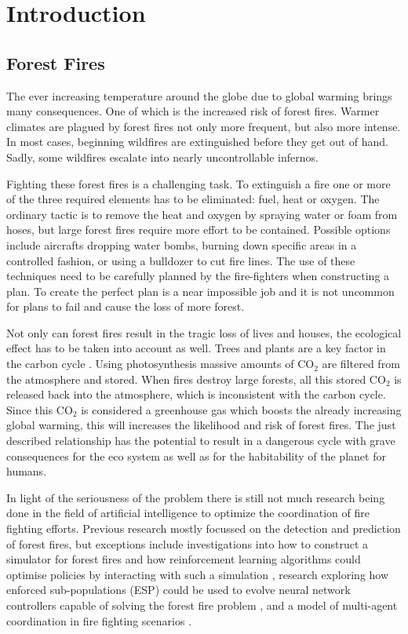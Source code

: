 
\section{Introduction}\label{sec:introduction}

\subsection{Forest Fires}
The ever increasing temperature around the globe due to global warming brings many consequences. One of which is the increased risk of forest fires. Warmer climates are plagued by forest fires not only more frequent, but also more intense.  In most cases, beginning wildfires are extinguished before they get out of hand. Sadly, some wildfires escalate into nearly uncontrollable infernos.

Fighting these forest fires is a challenging task. To extinguish a fire one or more of the three required elements has to be eliminated: fuel, heat or oxygen. The ordinary tactic is to remove the heat and oxygen by spraying water or foam from hoses, but large forest fires require more effort to be contained. Possible options include aircrafts dropping water bombs, burning down specific areas in a controlled fashion, or using a bulldozer to cut fire lines. The use of these techniques need to be carefully planned by the fire-fighters when constructing a plan. To create the perfect plan is a near impossible job and it is not uncommon for plans to fail and cause the loss of more forest.

Not only can forest fires result in the tragic loss of lives and houses, the ecological effect has to be taken into account as well. Trees and plants are a key factor in the carbon cycle \citep{kasischke1995fire}. Using photosynthesis massive amounts of CO$_{2}$ are filtered from the atmosphere and stored. When fires destroy large forests, all this stored CO$_{2}$ is released back into the atmosphere, which is inconsistent with the carbon cycle. Since this CO$_{2}$ is considered a greenhouse gas \citep{houghton1991climate} which boosts the already increasing global warming, this will increases the likelihood and risk of forest fires. The just described relationship has the potential to result in a dangerous cycle with grave consequences for the eco system as well as for the habitability of the planet for humans.

In light of the seriousness of the problem there is still not much research being done in the field of artificial intelligence to optimize the coordination of fire fighting efforts. Previous research mostly focussed on the detection and prediction of forest fires, but exceptions include investigations into how to construct a simulator for forest fires and how reinforcement learning algorithms could optimise policies by interacting with such a simulation \citep{wiering1998learning}, research exploring how enforced sub-populations (ESP) could be used to evolve neural network controllers capable of solving the forest fire problem \citep{wiering2005evolving}, and a model of multi-agent coordination in fire fighting scenarios \citep{moura2007fighting}.

